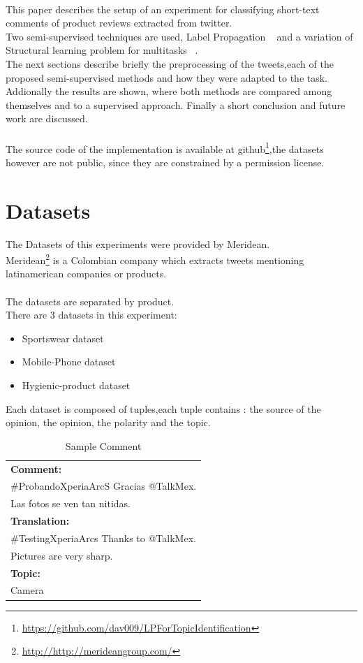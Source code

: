 \documentclass[4pt,a4paper,twocolumn]{article}
\begin{document}
\\
This paper describes the setup of an experiment for classifying short-text comments of product reviews extracted from twitter.\\
Two semi-supervised techniques are used, Label Propagation ~\cite{Zhu:2005:SLG:1104523}  and  a variation of Structural learning problem for multitasks ~\cite{Ando:2005:FLP:1046920.1194905}.\\
The next sections describe briefly  the preprocessing of the tweets,each of the proposed semi-supervised methods and how they were adapted to the task. \\
Addionally the results are shown, where both methods are compared among themselves and to a supervised approach.
Finally a short conclusion and future work are discussed.\\
\\
The source code of the implementation is available at github\footnote{\url{https://github.com/dav009/LPForTopicIdentification}},the datasets however are not public, since they are constrained by a permission license.

\section{Datasets}
The Datasets of this experiments were provided by Meridean.\\
Meridean\footnote{\url{http://http://merideangroup.com/}} is a Colombian company which extracts tweets
mentioning latinamerican companies or products.\\
\\
The datasets are separated by product.\\
There are 3 datasets in this experiment:
\begin{itemize}
	\item Sportswear dataset
	\item Mobile-Phone dataset
	\item Hygienic-product dataset
\end{itemize}

Each dataset is composed of tuples,each tuple contains : the source of the opinion, the opinion, the polarity and the topic.\\

\begin{table}[h]
\centering
\begin{tabular}{| l |}
\hline
\textbf{Comment:}\\
$\#$ProbandoXperiaArcS Gracias @TalkMex.\\
Las fotos se ven tan nitidas.\\
\hline
\textbf{Translation:}\\
$\#$TestingXperiaArcs Thanks to @TalkMex.\\
Pictures are very sharp.\\
\hline
\textbf{Topic:}\\
Camera\\
\hline
\end{tabular}
\caption{Sample Comment}
\label{tab:sampleTuple}
\end{table}
\end{document}
